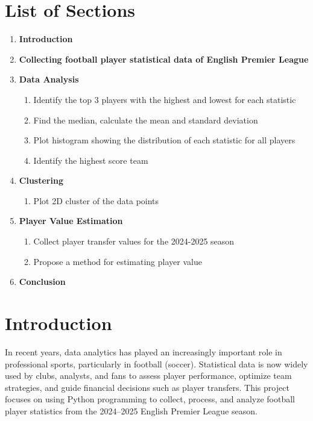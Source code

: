 \documentclass[a4paper,12pt]{article}
\begin{document}
\section*{List of Sections}
\begin{enumerate}
    \item\textbf{Introduction}
    \item \textbf{Collecting football player statistical data of English Premier League}
    
    \item \textbf{Data Analysis}
    \begin{enumerate}
        \item Identify the top 3 players with the highest and lowest for each statistic
        \item Find the median, calculate the mean and standard deviation
        \item Plot histogram showing the distribution of each statistic for all players
        \item Identify the highest score team
    \end{enumerate}
    
    \item \textbf{Clustering}
    \begin{enumerate}
        \item Plot 2D cluster of the data points
    \end{enumerate}
    
    \item \textbf{Player Value Estimation}
    \begin{enumerate}
        \item Collect player transfer values for the 2024-2025 season
        \item Propose a method for estimating player value
    \end{enumerate}
    \item\textbf{Conclusion}
\end{enumerate}

\newpage

\section{Introduction}

In recent years, data analytics has played an increasingly important role in professional sports, particularly in football (soccer). Statistical data is now widely used by clubs, analysts, and fans to assess player performance, optimize team strategies, and guide financial decisions such as player transfers. This project focuses on using Python programming to collect, process, and analyze football player statistics from the 2024–2025 English Premier League season.
\end{document}
